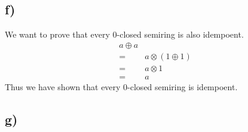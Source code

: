 \documentclass[a4paper,12pt]{ETHexercise}
\begin{document}
\subsection*{f)}
We want to prove that every 0-closed semiring is also idempoent.
\begin{align}
    a \oplus a\\
    = &a \otimes (1 \oplus 1)\\
    = &a \otimes 1\\
    = &a
\end{align}
Thus we have shown that every 0-closed semiring is idempoent.

\subsection*{g)}
\be
\end{document}
